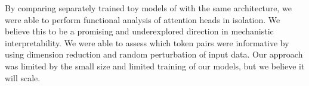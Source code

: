 \documentclass{article}
\begin{document}
By comparing separately trained toy models of with the same architecture, we were able to perform functional analysis of attention heads in isolation. We believe this to be a promising and underexplored direction in mechanistic interpretability. We were able to assess which token pairs were informative by using dimension reduction and random perturbation of input data. Our approach was limited by the small size and limited training of our models, but we believe it will scale.

  


\begin{thebibliography}{1}
\end{thebibliography}
\end{document}
